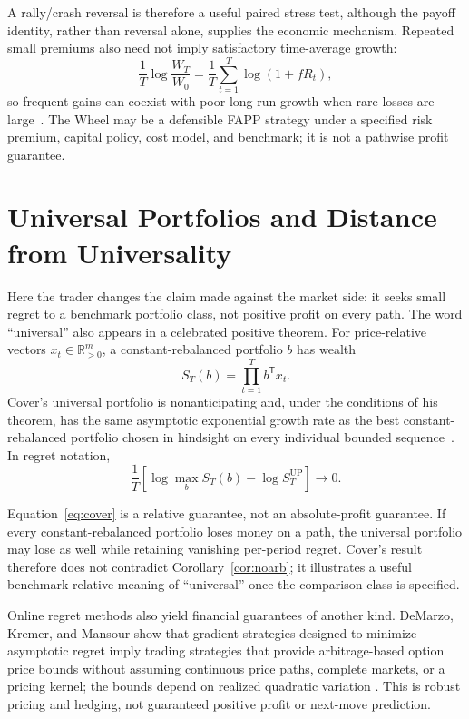 \documentclass[aps,pra,reprint,superscriptaddress,amsmath,amssymb,floatfix]{revtex4-2}
\theoremstyle{plain}
\theoremstyle{definition}
\theoremstyle{remark}
\begin{document}
A rally/crash reversal is therefore a useful paired stress test, although the
payoff identity, rather than reversal alone, supplies the economic mechanism.
Repeated small premiums also need not imply satisfactory time-average growth:
\[
  \frac1T\log\frac{W_T}{W_0}
  =\frac1T\sum_{t=1}^T\log(1+fR_t),
\]
so frequent gains can coexist with poor long-run growth when rare losses are
large~\cite{Peters2019}. The Wheel may be a defensible FAPP strategy under a
specified risk premium, capital policy, cost model, and benchmark; it is not a
pathwise profit guarantee.

\section{Universal Portfolios and Distance from Universality}
\label{sec:cover}

Here the trader changes the claim made against the market side: it seeks small
regret to a benchmark portfolio class, not positive profit on every path. The
word ``universal'' also appears in a celebrated positive theorem.
For price-relative vectors \(x_t\in\mathbb{R}_{>0}^m\), a constant-rebalanced
portfolio \(b\) has wealth
\[
  S_T(b)=\prod_{t=1}^T b^\mathsf{T}x_t.
\]
Cover's universal portfolio is nonanticipating and, under the conditions of
his theorem, has the same asymptotic exponential growth rate as the best
constant-rebalanced portfolio chosen in hindsight on every individual bounded
sequence~\cite{Cover1991}. In regret notation,
\begin{equation}
  \frac1T\left[
  \log\max_{b}S_T(b)-\log S_T^{\mathrm{UP}}
  \right]\longrightarrow0.
  \label{eq:cover}
\end{equation}

Equation~\eqref{eq:cover} is a relative guarantee, not an absolute-profit
guarantee. If every constant-rebalanced portfolio loses money on a path, the
universal portfolio may lose as well while retaining vanishing per-period
regret. Cover's result therefore does not contradict
Corollary~\ref{cor:noarb}; it illustrates a useful benchmark-relative meaning
of ``universal'' once the comparison class is specified.

Online regret methods also yield financial guarantees of another kind.
DeMarzo, Kremer, and Mansour show that gradient strategies designed to
minimize asymptotic regret imply trading strategies that provide
arbitrage-based option price bounds without assuming continuous price paths,
complete markets, or a pricing kernel; the bounds depend on realized quadratic
variation
\cite{DeMarzoKremerMansour2016}. This is robust pricing and hedging, not
guaranteed positive profit or next-move prediction.
\end{document}

